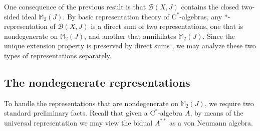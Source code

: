 \documentclass[10pt]{amsart}
\newcommand{\bM}{{\mathbb{M}}}
\newcommand{\B}{{\mathcal{B}}}
\newcommand{\rC}{\mathrm{C}}
\theoremstyle{definition}
\begin{document}
One consequence of the previous result is that $\B(X,J)$ contains the closed two-sided ideal $\bM_2(J)$. By basic representation theory of $\rC^*$-algebras, any $*$-representation of $\B(X,J)$ is a direct sum of two representations, one that is nondegenerate on $\bM_2(J)$, and another that annihilates $\bM_2(J)$. Since the unique extension property is preserved by direct sums \cite[Proposition 4.4]{arveson2011noncommutative}, we may analyze these two types of representations separately. 

\subsection{The nondegenerate representations}
To handle the representations that are nondegenerate on $\bM_2(J)$, we require two standard preliminary  facts. Recall  that given a $\rC^*$-algebra $A$, by means of the universal representation we may view the bidual $A^{**}$ as a von Neumann algebra. 
\end{document}
